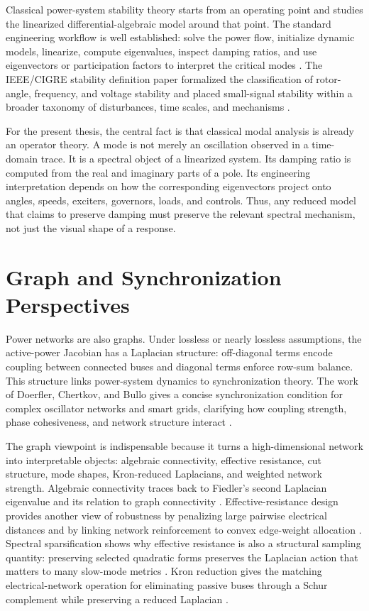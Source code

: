 Classical power-system stability theory starts from an operating point and
studies the linearized differential-algebraic model around that point. The
standard engineering workflow is well established: solve the power flow,
initialize dynamic models, linearize, compute eigenvalues, inspect damping
ratios, and use eigenvectors or participation factors to interpret the critical
modes \cite{kundur1994power,rogers2000oscillations}. The IEEE/CIGRE stability
definition paper formalized the classification of rotor-angle, frequency, and
voltage stability and placed small-signal stability within a broader taxonomy
of disturbances, time scales, and mechanisms \cite{kundur2004definition}.

For the present thesis, the central fact is that classical modal analysis is
already an operator theory. A mode is not merely an oscillation observed in a
time-domain trace. It is a spectral object of a linearized system. Its damping
ratio is computed from the real and imaginary parts of a pole. Its engineering
interpretation depends on how the corresponding eigenvectors project onto
angles, speeds, exciters, governors, loads, and controls. Thus, any reduced
model that claims to preserve damping must preserve the relevant spectral
mechanism, not just the visual shape of a response.

\section{Graph and Synchronization Perspectives}

Power networks are also graphs. Under lossless or nearly lossless assumptions,
the active-power Jacobian has a Laplacian structure: off-diagonal terms encode
coupling between connected buses and diagonal terms enforce row-sum balance.
This structure links power-system dynamics to synchronization theory. The work
of Doerfler, Chertkov, and Bullo gives a concise synchronization condition for
complex oscillator networks and smart grids, clarifying how coupling strength,
phase cohesiveness, and network structure interact \cite{dorfler2013synchronization}.

The graph viewpoint is indispensable because it turns a high-dimensional
network into interpretable objects: algebraic connectivity, effective
resistance, cut structure, mode shapes, Kron-reduced Laplacians, and weighted
network strength. Algebraic connectivity traces back to Fiedler's second
Laplacian eigenvalue and its relation to graph connectivity
\cite{fiedler1973algebraic}. Effective-resistance design provides another
view of robustness by penalizing large pairwise electrical distances and by
linking network reinforcement to convex edge-weight allocation
\cite{ghosh2008effective}. Spectral sparsification shows why effective
resistance is also a structural sampling quantity: preserving selected
quadratic forms preserves the Laplacian action that matters to many slow-mode
metrics \cite{spielman2011sparsification}. Kron reduction gives the matching
electrical-network operation for eliminating passive buses through a Schur
complement while preserving a reduced Laplacian
\cite{dorfler2013kron}.

